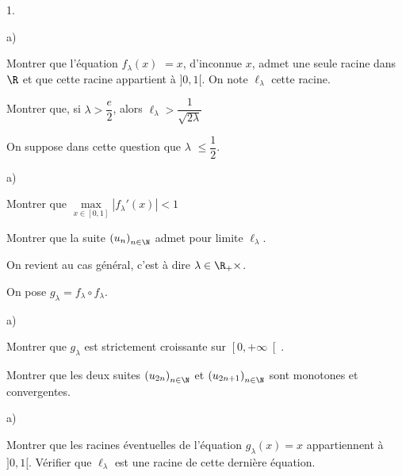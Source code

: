 \documentclass[11pt]{article}%
\begin{document}
\begin{noliste}{1.}
 \setlength{\itemsep}{4mm}
\item 

\begin{noliste}{a)}
 \setlength{\itemsep}{2mm}
\item Montrer que l'équation $f_{\lambda }\left( x\right) $ $ = x$,
d'inconnue 
$x$, admet une seule racine dans $\R$ et que cette racine appartient 
à $]0,1[$. On note $\ell_{\lambda }$ cette racine.

\item Montrer que, si $\lambda >\dfrac{e}{2}$, alors $\ell_{\lambda
}>\dfrac{1}{\sqrt{2\lambda }}$
\end{noliste}

\item On suppose dans cette question que $\lambda $ $\leq
\dfrac{1}{2}$.

\begin{noliste}{a)}
 \setlength{\itemsep}{2mm}
\item Montrer que $\max\limits_{x\in \left[ 0,1\right] }\left|
f_{\lambda }{\prime }\left( x\right) \right| <1$

\item Montrer que la suite $\left( u_{n}\right)_{n\in \N}$ admet
pour limite $\ell_{\lambda }$.
\end{noliste}

On revient au cas général, c'est à dire $\lambda \in \R_{+}{\times
} $.

\item On pose $g_{\lambda } = f_{\lambda }\circ f_{\lambda }$.

\begin{noliste}{a)}
 \setlength{\itemsep}{2mm}
\item Montrer que $g_{\lambda }$ est strictement croissante sur $\left[
0, + \infty \right[ $.

\item Montrer que les deux suites $\left( u_{2n}\right)_{n\in \N}$
et $\left( u_{2n + 1}\right)_{n\in \N}$ sont monotones et
convergentes.
\end{noliste}

\item 

\begin{noliste}{a)}
 \setlength{\itemsep}{2mm}
\item Montrer que les racines éventuelles de l'équation $g_{\lambda
}\left(
x\right) = x$ appartiennent à $]0,1[$. Vérifier que $\ell_{\lambda }$
est
une racine de cette dernière équation.


\end{noliste}
\end{noliste}
\end{document}
